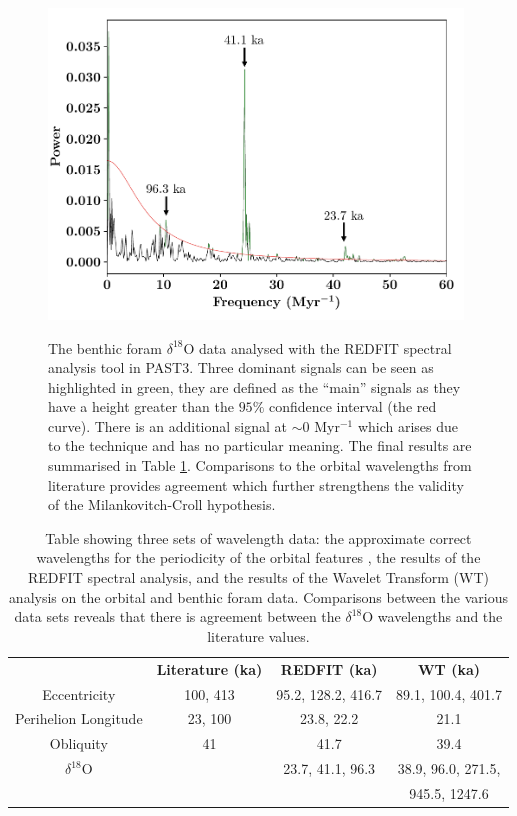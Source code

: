 \documentclass[12pt, onecolumn]{revtex4}    %
\begin{document}
\begin{figure}[!h]
\begin{center}
\includegraphics[width=11cm]{figures/d18O_redfit}
\caption[]{The benthic foram $\delta^{18}$O data analysed with the REDFIT spectral analysis tool in PAST3. Three dominant signals can be seen as highlighted in green, they are defined as the ``main'' signals as they have a height greater than the $95\%$ confidence interval (the red curve). There is an additional signal at $\sim$0 Myr$^{-1}$ which arises due to the technique and has no particular meaning. The final results are summarised in Table \ref{table:final_results}. Comparisons to the orbital wavelengths from literature provides agreement which further strengthens the validity of the Milankovitch-Croll hypothesis.}
\vspace{-3ex}
\label{fig:d18o_redfit}
\end{center}
\end{figure}

\begin{table}[h!]
\centering
\begin{tabular}{c@{\hskip 20pt}c@{\hskip 20pt}c@{\hskip 20pt}c} 
 \hline
  & \textbf{Literature (ka)} &\textbf{REDFIT (ka)} & \textbf{WT (ka)} \\ [0.5ex] 
 Eccentricity & 100, 413 & 95.2, 128.2, 416.7 & 89.1, 100.4,  401.7\\
 Perihelion Longitude & 23, 100 & 23.8, 22.2 & 21.1 \\
 Obliquity & 41 & 41.7 & 39.4 \\
 $\delta^{18}$O & & 23.7, 41.1, 96.3  & 38.9, 96.0, 271.5, \\
 & & & 945.5, 1247.6 \\
 \hline
\end{tabular}
\caption{Table showing three sets of wavelength data: the approximate correct wavelengths for the periodicity of the orbital features \cite{campisano_milankovitch}, the results of the REDFIT spectral analysis, and the results of the Wavelet Transform (WT) analysis on the orbital and benthic foram data. Comparisons between the various data sets reveals that there is agreement between the $\delta^{18}$O wavelengths and the literature values. }
\vspace{-0.5em}
\label{table:final_results}
\end{table}
\end{document}

